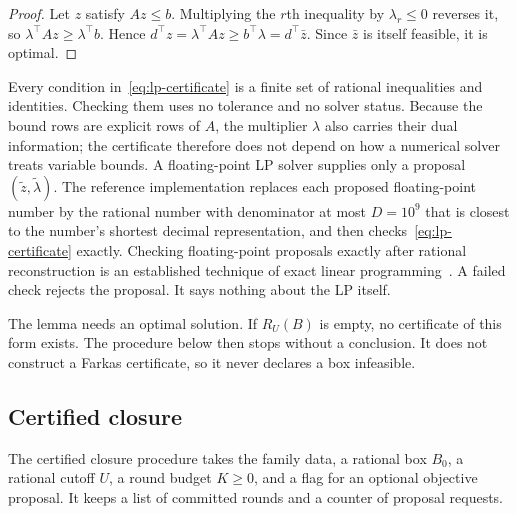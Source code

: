 \begin{proof}
Let $z$ satisfy $Az\le b$. Multiplying the $r$th inequality by
$\lambda_r\le0$ reverses it, so $\lambda^\top Az\ge\lambda^\top b$. Hence
$d^\top z=\lambda^\top Az\ge b^\top\lambda=d^\top\bar z$. Since $\bar z$ is
itself feasible, it is optimal.
\end{proof}

Every condition in~\eqref{eq:lp-certificate} is a finite set of rational
inequalities and identities. Checking them uses no tolerance and no solver
status. Because the bound rows are explicit rows of $A$, the multiplier
$\lambda$ also carries their dual information; the certificate therefore does
not depend on how a numerical solver treats variable bounds. A floating-point
LP solver supplies only a proposal $(\tilde z,\tilde\lambda)$. The reference
implementation replaces each proposed floating-point number by the rational
number with denominator at most $D=10^9$ that is closest to the number's
shortest decimal representation, and then checks~\eqref{eq:lp-certificate}
exactly. Checking floating-point proposals exactly after rational
reconstruction is an established technique of exact linear programming~\cite{applegate2007-exact-solutions-to-linear-programming}. A
failed check rejects the proposal. It says nothing about the LP itself.

The lemma needs an optimal solution. If $R_U(B)$ is empty, no certificate of
this form exists. The procedure below then stops without a conclusion. It
does not construct a Farkas certificate, so it never declares a box infeasible.

\subsection{Certified closure}\label{sec:algorithms-closure}

The certified closure procedure takes the family data, a rational box $B_0$,
a rational cutoff $U$, a round budget $K\ge0$, and a flag for an optional
objective proposal. It keeps a list of committed rounds and a counter of
proposal requests.

